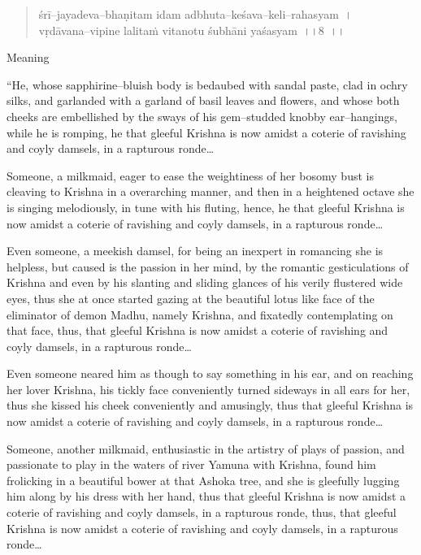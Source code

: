 \begin{verse}
śrī–jayadeva–bhaṇitam idam adbhuta–keśava–keli–rahasyam~।\\ vṛdāvana–vipine lalitaṁ vitanotu śubhāni yaśasyam~।।8~।।
\end{verse}

Meaning

\begin{myquote}
“He, whose sapphirine–bluish body is bedaubed with sandal paste, clad in ochry silks, and garlanded with a garland of basil leaves and flowers, and whose both cheeks are embellished by the sways of his gem–studded knobby ear–hangings, while he is romping, he that gleeful Krishna is now amidst a coterie of ravishing and coyly damsels, in a rapturous ronde…
\end{myquote}

\begin{myquote}
Someone, a milkmaid, eager to ease the weightiness of her bosomy bust is cleaving to Krishna in a overarching manner, and then in a heightened octave she is singing melodiously, in tune with his fluting, hence, he that gleeful Krishna is now amidst a coterie of ravishing and coyly damsels, in a rapturous ronde…
\end{myquote}

\begin{myquote}
Even someone, a meekish damsel, for being an inexpert in romancing she is helpless, but caused is the passion in her mind, by the romantic gesticulations of Krishna and even by his slanting and sliding glances of his verily flustered wide eyes, thus she at once started gazing at the beautiful lotus like face of the eliminator of demon Madhu, namely Krishna, and fixatedly contemplating on that face, thus, that gleeful Krishna is now amidst a coterie of ravishing and coyly damsels, in a rapturous ronde…
\end{myquote}

\begin{myquote}
Even someone neared him as though to say something in his ear, and on reaching her lover Krishna, his tickly face conveniently turned sideways in all ears for her, thus she kissed his cheek conveniently and amusingly, thus that gleeful Krishna is now amidst a coterie of ravishing and coyly damsels, in a rapturous ronde…
\end{myquote}

\begin{myquote}
Someone, another milkmaid, enthusiastic in the artistry of plays of passion, and passionate to play in the waters of river Yamuna with Krishna, found him frolicking in a beautiful bower at that Ashoka tree, and she is gleefully lugging him along by his dress with her hand, thus that gleeful Krishna is now amidst a coterie of ravishing and coyly damsels, in a rapturous ronde, thus, that gleeful Krishna is now amidst a coterie of ravishing and coyly damsels, in a rapturous ronde…
\end{myquote}

